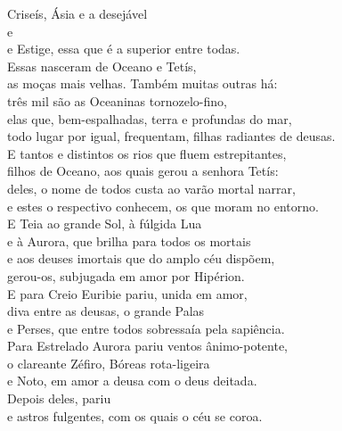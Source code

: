 \begin{pages}
\begin{Rightside}
Criseís, Ásia e a desejável \\
   e \\
e Estige, essa que é a superior entre todas.\\
Essas nasceram de Oceano e Tetís,\\
as moças mais velhas. Também muitas outras há:\\
três mil são as Oceaninas tornozelo-fino,\\
elas que, bem-espalhadas, terra e profundas do mar, \\
todo lugar por igual, frequentam, filhas radiantes de deusas.\\
E tantos e distintos os rios que fluem estrepitantes,\\
filhos de Oceano, aos quais gerou a senhora Tetís:\\
deles, o nome de todos custa ao varão mortal narrar,\\
e estes o respectivo conhecem, os que moram no entorno. \\

\quad{}E Teia ao grande Sol, à fúlgida Lua\\
e à Aurora, que brilha para todos os mortais\\
e aos deuses imortais que do amplo céu dispõem,\\
gerou-os, subjugada em amor por Hipérion.\\
E para Creio Euribie pariu, unida em amor, \\
diva entre as deusas, o grande  Palas\\
e Perses, que entre todos sobressaía pela sapiência.\\
Para Estrelado Aurora pariu ventos ânimo-potente,\\
o clareante Zéfiro, Bóreas rota-ligeira\\
e Noto, em amor a deusa com o deus deitada. \\
Depois deles,  pariu \\
e astros fulgentes, com os quais o céu se coroa.\\


\end{Rightside}
\end{pages}
